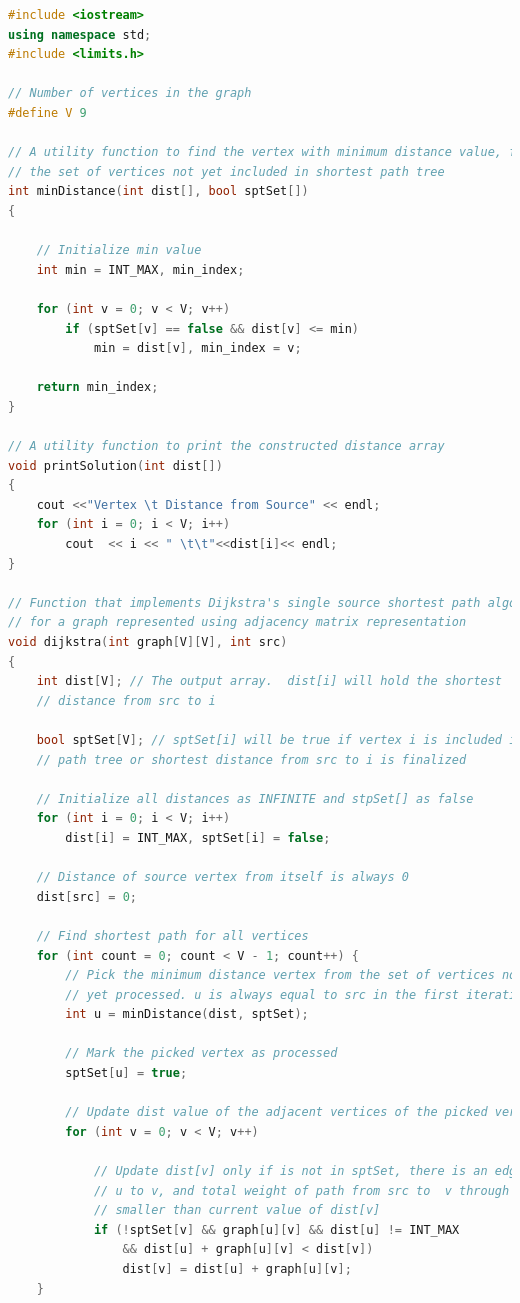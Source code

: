 \documentclass[11pt]{scrartcl}
\begin{document}
\begin{lstlisting}[language = c++]
#include <iostream>
using namespace std;
#include <limits.h>
 
// Number of vertices in the graph
#define V 9
 
// A utility function to find the vertex with minimum distance value, from
// the set of vertices not yet included in shortest path tree
int minDistance(int dist[], bool sptSet[])
{
   
    // Initialize min value
    int min = INT_MAX, min_index;
 
    for (int v = 0; v < V; v++)
        if (sptSet[v] == false && dist[v] <= min)
            min = dist[v], min_index = v;
 
    return min_index;
}
 
// A utility function to print the constructed distance array
void printSolution(int dist[])
{
    cout <<"Vertex \t Distance from Source" << endl;
    for (int i = 0; i < V; i++)
        cout  << i << " \t\t"<<dist[i]<< endl;
}
 
// Function that implements Dijkstra's single source shortest path algorithm
// for a graph represented using adjacency matrix representation
void dijkstra(int graph[V][V], int src)
{
    int dist[V]; // The output array.  dist[i] will hold the shortest
    // distance from src to i
 
    bool sptSet[V]; // sptSet[i] will be true if vertex i is included in shortest
    // path tree or shortest distance from src to i is finalized
 
    // Initialize all distances as INFINITE and stpSet[] as false
    for (int i = 0; i < V; i++)
        dist[i] = INT_MAX, sptSet[i] = false;
 
    // Distance of source vertex from itself is always 0
    dist[src] = 0;
 
    // Find shortest path for all vertices
    for (int count = 0; count < V - 1; count++) {
        // Pick the minimum distance vertex from the set of vertices not
        // yet processed. u is always equal to src in the first iteration.
        int u = minDistance(dist, sptSet);
 
        // Mark the picked vertex as processed
        sptSet[u] = true;
 
        // Update dist value of the adjacent vertices of the picked vertex.
        for (int v = 0; v < V; v++)
 
            // Update dist[v] only if is not in sptSet, there is an edge from
            // u to v, and total weight of path from src to  v through u is
            // smaller than current value of dist[v]
            if (!sptSet[v] && graph[u][v] && dist[u] != INT_MAX
                && dist[u] + graph[u][v] < dist[v])
                dist[v] = dist[u] + graph[u][v];
    }
 

\end{lstlisting}
\end{document}
